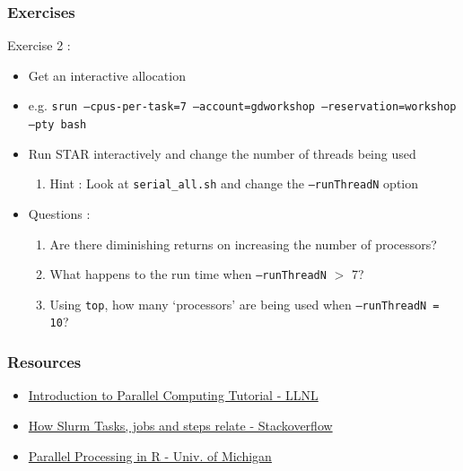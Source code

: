\documentclass{beamer}
\newcommand{\code}[1]{\colorbox{codegray}{\texttt{#1}}}
\begin{document}


\begin{frame}
\frametitle{Exercises}
Exercise 2 : 
\begin{itemize}
    \item Get an interactive allocation
    \pause
    \item e.g. \code{\tiny srun --cpus-per-task=7 --account=gdworkshop --reservation=workshop --pty bash}
    \pause
    \item Run STAR interactively and change the number of threads being used
    \pause
    \begin{enumerate}
        \item Hint : Look at \code{\scriptsize serial\_all.sh} and change the \code{\scriptsize --runThreadN} option
    \end{enumerate}
    \pause
    \item Questions :
    \begin{enumerate}
        \item  Are there diminishing returns on increasing the number of processors?
        \pause
        \item What happens to the run time when \code{--runThreadN} $>$  7?  
        \pause
        \item Using \code{top}, how many `processors' are being used when \code{--runThreadN = 10}?
    \end{enumerate}
\end{itemize}
\end{frame}


\begin{frame}
\frametitle{Resources}
\begin{itemize}
    \item \href{https://hpc.llnl.gov/documentation/tutorials/introduction-parallel-computing-tutorial}{\color{blue}Introduction to Parallel Computing Tutorial - LLNL}
    \item \href{https://stackoverflow.com/a/46532581/4021436}{\color{blue}How Slurm Tasks, jobs and steps relate - Stackoverflow}
    \item \href{https://dept.stat.lsa.umich.edu/~jerrick/courses/stat701/notes/parallel.html}{\color{blue}Parallel Processing in R - Univ. of Michigan}
    \bigskip
\end{itemize}
\end{frame}
\end{document}
